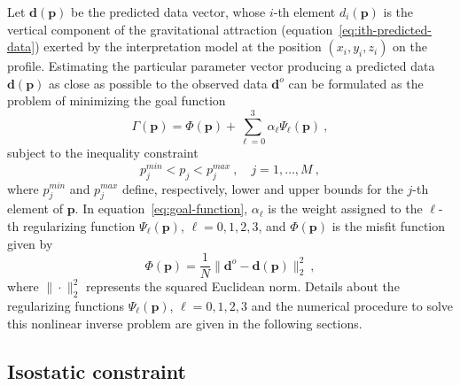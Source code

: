 \documentclass[manuscript]{geophysics}
\begin{document}
Let $\mathbf{d}(\mathbf{p})$ be the predicted data vector, whose $i$-th element
$d_{i}(\mathbf{p})$ is the vertical component of the gravitational attraction
(equation~\ref{eq:ith-predicted-data}) exerted by the interpretation model
at the position $(x_{i}, y_{i}, z_{i})$ on the profile.
Estimating the particular parameter vector producing a predicted data
$\mathbf{d}(\mathbf{p})$ as close as possible to the observed data 
$\mathbf{d}^{o}$ can be formulated as the problem of minimizing the goal function
\begin{equation}
\Gamma (\mathbf{p}) = \Phi(\mathbf{p}) + \sum_{\ell = 0}^{3} \alpha_{\ell}
\Psi_{\ell}(\mathbf{p}) \: ,
\label{eq:goal-function}
\end{equation}
subject to the inequality constraint 
\begin{equation}
p_{j}^{min} < p_{j} < p_{j}^{max} \: , \quad j = 1, \dots, M \: ,
\label{eq:inequality-constraint}
\end{equation}
where $p_{j}^{min}$ and $p_{j}^{max}$ define, respectively, lower and upper bounds 
for the $j$-th element of $\mathbf{p}$.
In equation~\ref{eq:goal-function}, $\alpha_{\ell}$ is the weight assigned to the 
$\ell$-th regularizing function $\Psi_{\ell}(\mathbf{p})$, $\ell = 0, 1, 2, 3$, and
$\Phi(\mathbf{p})$ is the misfit function given by
\begin{equation}
\Phi(\mathbf{p}) = \frac{1}{N} \| \mathbf{d}^{o} - \mathbf{d}(\mathbf{p}) \|_{2}^{2} 
\: , 
\label{eq:misfit-function}
\end{equation}
where $\| \cdot \|_{2}^{2}$ represents the squared Euclidean norm. Details about 
the regularizing functions $\Psi_{\ell}(\mathbf{p})$, $\ell = 0, 1, 2, 3$ and the 
numerical procedure to solve this nonlinear inverse problem are given in the following 
sections.


\subsection{Isostatic constraint}
\end{document}
